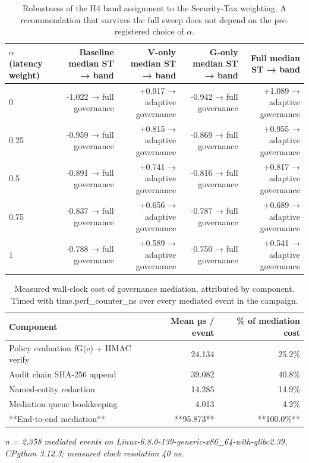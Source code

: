 \begin{table}[htbp]
\centering
\small
\caption{Robustness of the H4 band assignment to the Security-Tax weighting. A recommendation that survives the full sweep does not depend on the pre-registered choice of $\alpha$.}
\label{tab:gmais-7}
\begin{tabular}{lrrrr}
\toprule
$\alpha$ (latency weight) & Baseline median ST → band & V-only median ST → band & G-only median ST → band & Full median ST → band \\
\midrule
0 & -1.022 → full governance & +0.917 → adaptive governance & -0.942 → full governance & +1.089 → adaptive governance \\
0.25 & -0.959 → full governance & +0.815 → adaptive governance & -0.869 → full governance & +0.955 → adaptive governance \\
0.5 & -0.891 → full governance & +0.741 → adaptive governance & -0.816 → full governance & +0.817 → adaptive governance \\
0.75 & -0.837 → full governance & +0.656 → adaptive governance & -0.787 → full governance & +0.689 → adaptive governance \\
1 & -0.788 → full governance & +0.589 → adaptive governance & -0.750 → full governance & +0.541 → adaptive governance \\
\bottomrule
\end{tabular}
\end{table}


\begin{table}[htbp]
\centering
\small
\caption{Measured wall-clock cost of governance mediation, attributed by component. Timed with time.perf\_counter\_ns over every mediated event in the campaign.}
\label{tab:gmais-8}
\begin{tabular}{lrr}
\toprule
Component & Mean µs / event & \% of mediation cost \\
\midrule
Policy evaluation fG(e) + HMAC verify & 24.134 & 25.2\% \\
Audit chain SHA-256 append & 39.082 & 40.8\% \\
Named-entity redaction & 14.285 & 14.9\% \\
Mediation-queue bookkeeping & 4.013 & 4.2\% \\
**End-to-end mediation** & **95.873** & **100.0\%** \\
\bottomrule
\end{tabular}
\par\vspace{2pt}\footnotesize\emph{n = 2,358 mediated events on Linux-6.8.0-139-generic-x86\_64-with-glibc2.39, CPython 3.12.3; measured clock resolution 40 ns.}
\end{table}


